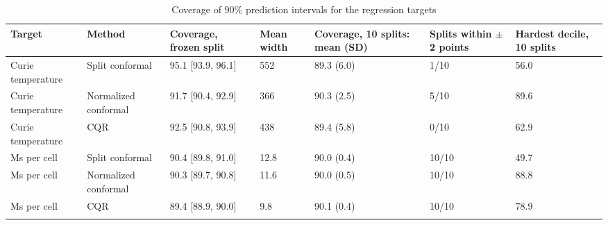 \begin{table}[h]
\caption{Coverage of 90\% prediction intervals for the regression targets}
\label{tab:table3_regression_intervals}
\begin{tabular*}{\textwidth}{@{\extracolsep\fill}lllllll}
\toprule
Target & Method & Coverage, frozen split & Mean width & Coverage, 10 splits: mean (SD) & Splits within $\pm$2 points & Hardest decile, 10 splits \\
\midrule
Curie temperature & Split conformal & 95.1 [93.9, 96.1] & 552 & 89.3 (6.0) & 1/10 & 56.0 \\
Curie temperature & Normalized conformal & 91.7 [90.4, 92.9] & 366 & 90.3 (2.5) & 5/10 & 89.6 \\
Curie temperature & CQR & 92.5 [90.8, 93.9] & 438 & 89.4 (5.8) & 0/10 & 62.9 \\
Ms per cell & Split conformal & 90.4 [89.8, 91.0] & 12.8 & 90.0 (0.4) & 10/10 & 49.7 \\
Ms per cell & Normalized conformal & 90.3 [89.7, 90.8] & 11.6 & 90.0 (0.5) & 10/10 & 88.8 \\
Ms per cell & CQR & 89.4 [88.9, 90.0] & 9.8 & 90.1 (0.4) & 10/10 & 78.9 \\
\botrule
\end{tabular*}
\end{table}
